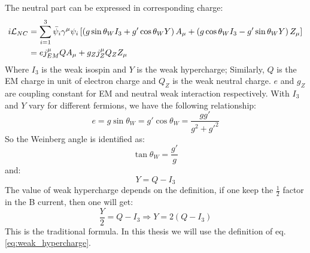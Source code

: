 The neutral part can be expressed in corresponding charge:
\begin{equation}
    \begin{aligned}
	i\mathcal{L}_{NC} &= \sum_{i=1}^{3} \bar{\psi}_i\gamma^\mu\psi_i
	\left[ 
	    \left(g\sin\theta_W I_3 + g'\cos\theta_W Y \right) A_\mu 
	    + \left(g\cos\theta_W I_3 - g'\sin\theta_W Y \right) Z_\mu 
	\right]	\\
	&= ej^\mu_{EM}QA_\mu + g_Zj^\mu_Z Q_Z Z_\mu \\
    \end{aligned}
\end{equation}
Where $I_3$ is the weak isospin and $Y$ is the weak hypercharge; Similarly, $Q$ is
the EM charge in unit of electron charge and $Q_Z$ is the weak neutral charge.
$e$ and $g_Z$ are coupling constant for EM and neutral weak interaction respectively.
With $I_3$ and $Y$ vary for different fermions, we have the following relationship:
\begin{equation}
    e = g\sin\theta_W = g'\cos\theta_W = \frac{gg'}{g^2 + g'^2}
\end{equation}
So the Weinberg angle is identified as:
\begin{equation}
    \tan\theta_W = \frac{g'}{g}
\end{equation}
and: 
\begin{equation}
    Y = Q - I_3
    \label{eq:weak_hypercharge}
\end{equation}
The value of weak hypercharge depends on the definition, if one keep the $\frac{1}{2}$
factor in the B current, then one will get:
\begin{equation}
    \frac{Y}{2} = Q - I_3   \Rightarrow Y = 2(Q-I_3)
\end{equation}
This is the traditional formula.
In this thesis we will use the definition of eq. \ref{eq:weak_hypercharge}.

